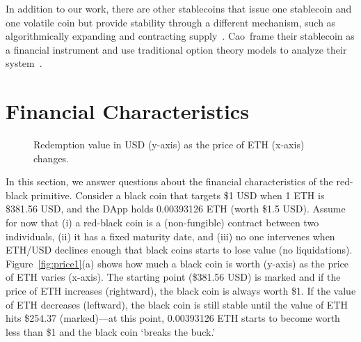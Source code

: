 In addition to our work, there are other stablecoins that issue one stablecoin and one volatile coin but provide stability through a different mechanism, such as algorithmically expanding and contracting supply~\cite{Sam15}. Cao~\etal frame their stablecoin as a financial instrument and use traditional option theory models to analyze their system~\cite{DUOnet}.


\section{Financial Characteristics}


\begin{figure}[t]
    \centering
        \qquad
    \caption{Redemption value in USD (y-axis) as the price of ETH (x-axis) changes. \label{fig:price1} \label{fig:price2}}
\end{figure}

In this section, we answer questions about the financial characteristics of the red-black primitive. Consider a black coin that targets \$1 USD when 1 ETH is \$381.56 USD, and the DApp holds 0.00393126 ETH (worth \$1.5 USD).  Assume for now that (i) a red-black coin is a (non-fungible) contract between two individuals, (ii) it has a fixed maturity date, and (iii) no one intervenes when ETH/USD declines enough that black coins starts to lose value (no liquidations). Figure~\ref{fig:price1}(a) shows how much a black coin is worth (y-axis) as the price of ETH varies (x-axis). The starting point (\$381.56 USD) is marked and if the price of ETH increases (rightward), the black coin is always worth \$1. If the value of ETH decreases (leftward), the black coin is still stable until the value of ETH hits \$254.37 (marked)---at this point, 0.00393126 ETH starts to become worth less than \$1 and the black coin `breaks the buck.'

